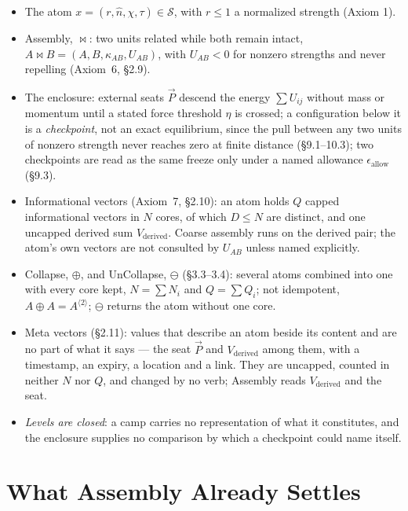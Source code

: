 \documentclass[12pt, a4paper]{article}
\begin{document}
\begin{itemize}
\item The atom $x=(r,\hat n,\chi,\tau)\in\mathcal{S}$, with $r\le 1$
      a normalized strength (Axiom 1).
\item Assembly, $\bowtie$: two units related while both remain
      intact, $A\bowtie B=(A,B,\kappa_{AB},U_{AB})$, with
      $U_{AB}<0$ for nonzero strengths and never repelling (Axiom~6, \S2.9).
\item The enclosure: external seats $\vec P$ descend the energy
      $\sum U_{ij}$ without mass or momentum until a stated force
      threshold $\eta$ is crossed; a configuration below it is a
      \emph{checkpoint}, not an exact equilibrium, since the pull
      between any two units of nonzero strength never reaches zero
      at finite distance (\S9.1--10.3); two checkpoints are read as the same freeze only under a
      named allowance $\epsilon_{\text{allow}}$ (\S9.3).
\item Informational vectors (Axiom~7, \S2.10): an atom holds $Q$
      capped informational vectors in $N$ cores, of which $D\le N$ are
      distinct, and one uncapped derived sum $V_{\mathrm{derived}}$.
      Coarse assembly runs on the derived pair; the atom's own
      vectors are not consulted by $U_{AB}$ unless named explicitly.
\item Collapse, $\oplus$, and UnCollapse, $\ominus$ (\S3.3--3.4):
      several atoms combined into one with every core kept,
      $N=\sum N_i$ and $Q=\sum Q_i$; not idempotent,
      $A\oplus A=A^{\langle 2\rangle}$; $\ominus$ returns the atom
      without one core.
\item Meta vectors (\S2.11): values that describe an atom beside its
      content and are no part of what it says --- the seat $\vec P$
      and $V_{\mathrm{derived}}$ among them, with a timestamp, an
      expiry, a location and a link. They are uncapped, counted in
      neither $N$ nor $Q$, and changed by no verb; Assembly reads
      $V_{\mathrm{derived}}$ and the seat.
\item \emph{Levels are closed}: a camp carries no representation of
      what it constitutes, and the enclosure supplies no comparison
      by which a checkpoint could name itself.
\end{itemize}

\section{What Assembly Already Settles}
\label{sec:already_settled}
\end{document}
